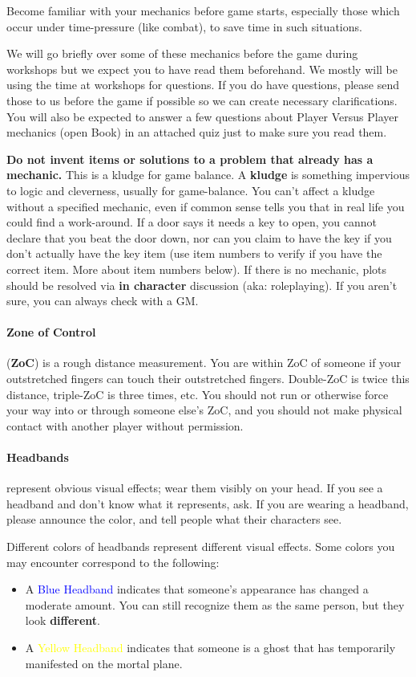 \documentclass[sheet]{GL2020}
\begin{document}
Become familiar with your mechanics before game starts, especially those which occur under time-pressure (like combat), to save time in such situations.

We will go briefly over some of these mechanics before the game during workshops but we expect you to have read them beforehand. We mostly will be using the time at workshops for questions. If you do have questions, please send those to us before the game if possible so we can create necessary clarifications. You will also be expected to answer a few questions about Player Versus Player mechanics (open Book) in an attached quiz just to make sure you read them.

\textbf{Do not invent items or solutions to a problem that already has a mechanic.} This is a kludge for game balance. A \textbf{kludge} is something impervious to logic and cleverness, usually for game-balance. You can't affect a kludge without a specified mechanic, even if common sense tells you that in real life you could find a work-around. If a door says it needs a key to open, you cannot declare that you beat the door down, nor can you claim to have the key if you don't actually have the key item (use item numbers to verify if you have the correct item. More about item numbers below). If there is no mechanic, plots should be resolved via \textbf{in character} discussion (aka: roleplaying). If you aren't sure, you can always check with a GM. 

\paragraph{Zone of Control} ({\bf ZoC}) is a rough distance measurement. You are within ZoC of someone if your outstretched fingers can touch their outstretched fingers. Double-ZoC is twice this distance, triple-ZoC is three times, etc. You should not run or otherwise force your way into or through someone else's ZoC, and you should not make physical contact with another player without permission.

\paragraph{Headbands} represent obvious visual effects; wear them visibly on your head. If you see a headband and don't know what it represents, ask. If you are wearing a headband, please announce the color, and tell people what their characters see.

Different colors of headbands represent different visual effects. Some colors you may encounter correspond to the following:
\begin{itemize}
	\item A \textcolor{blue}{Blue Headband} indicates that someone’s appearance has changed a moderate amount. You can still recognize them as the same person, but they look \textbf{different}.
	\item A \textcolor{yellow}{Yellow Headband} indicates that someone is a ghost that has temporarily manifested on the mortal plane.
\end{itemize}
\end{document}
